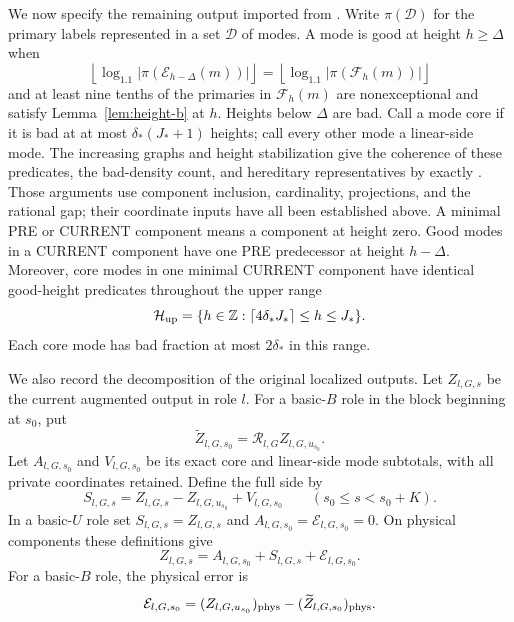 We now specify the remaining output imported from
\cite[Section~8]{H}.  Write \(\pi(\mathcal D)\) for the
primary labels represented in a set \(\mathcal D\) of modes.
A mode is good at height \(h\ge\Delta\) when
\[
 \left\lfloor\log_{1.1}|\pi(\mathcal E_{h-\Delta}(m))|\right\rfloor
 =
 \left\lfloor\log_{1.1}|\pi(\mathcal F_h(m))|\right\rfloor
\]
and at least nine tenths of the primaries in \(\mathcal F_h(m)\)
are nonexceptional and satisfy Lemma~\ref{lem:height-b} at \(h\).
Heights below \(\Delta\) are bad.
Call a mode core if it is bad at at most \(\delta_*(J_*+1)\) heights;
call every other mode a linear-side mode.  The increasing graphs and
height stabilization give the coherence of these predicates,
the bad-density count, and hereditary representatives by exactly
\cite[Lemmas~8.4--8.8, Proposition~8.9, and Lemma~8.10]{H}.  Those arguments use component inclusion,
cardinality, projections, and the rational gap; their coordinate
inputs have all been established above.  A minimal PRE or CURRENT
component means a component at height zero.  Good modes in a CURRENT
component have one PRE predecessor at height \(h-\Delta\).  Moreover,
core modes in one minimal CURRENT component have identical good-height
predicates throughout the upper range
\[
 \mathcal H_{\rm up}=
 \{h\in\mathbb Z:\lceil4\delta_*J_*\rceil\le h\le J_*\}.
\]
Each core mode has bad fraction at most \(2\delta_*\) in this range.

We also record the decomposition of the original localized outputs.
Let \(Z_{l,G,s}\) be the current augmented output in role \(l\).
For a basic-\(B\) role in the block beginning at \(s_0\), put
\[
 \widetilde Z_{l,G,s_0}
       =\mathcal R_{l,G} Z_{l,G,u_{s_0}}.
\]
Let \(A_{l,G,s_0}\) and \(V_{l,G,s_0}\) be its exact core and
linear-side mode subtotals, with all private coordinates retained.
Define the full side by
\[
 S_{l,G,s}=Z_{l,G,s}-Z_{l,G,u_{s_0}}+V_{l,G,s_0}
       \qquad(s_0\le s<s_0+K).
\]
In a basic-\(U\) role set \(S_{l,G,s}=Z_{l,G,s}\) and
\(A_{l,G,s_0}=\mathcal E_{l,G,s_0}=0\).
On physical components these definitions give
\[
 Z_{l,G,s}=A_{l,G,s_0}+S_{l,G,s}+\mathcal E_{l,G,s_0}.
\]
For a basic-\(B\) role, the physical error is
\[
 \mathcal E_{l,G,s_0}
   =(Z_{l,G,u_{s_0}})_{\rm phys}
          -(\widetilde Z_{l,G,s_0})_{\rm phys}.
\]

